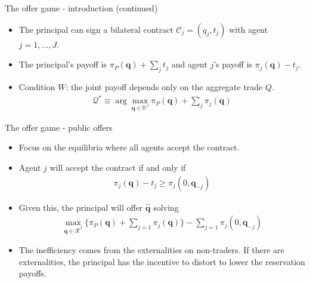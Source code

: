 \documentclass[aspectratio=169]{beamer}  %
\begin{document}
\begin{frame}{The offer game - introduction (continued)}
    \begin{itemize}
        \item The principal can sign a bilateral contract $\mathcal{C}_j=(q_j,t_j)$ with agent $j=1,...,J$. \vspace{.2cm}
        \item The principal's payoff is $\pi_P(\mathbf{q})+\sum_{j}t_j$ and agent $j$'s payoff is $\pi_j(\mathbf{q})-t_j$. \vspace{.2cm}
        \item Condition $W$: the joint payoff depends only on the aggregate trade $Q$. \vspace{.2cm}
        \begin{align*}
            \mathcal{Q}^* \equiv \arg \max_{\mathbf{q} \in \mathbb{R}^J} \pi_P(\mathbf{q}) + \sum_j \pi_j(\mathbf{q})
        \end{align*}
    \end{itemize}
\end{frame}



\begin{frame}{The offer game - public offers}
    \begin{itemize}
        \item Focus on the equilibria where all agents accept the contract. \vspace{.2cm}
        \item Agent $j$ will accept the contract if and only if
        \begin{align*}
            \pi_j(\mathbf{q}) - t_j \geq \pi_j(0, \mathbf{q}_{-j})
        \end{align*}
        \item Given this, the principal will offer $\hat{\mathbf{q}}$ solving
        \begin{align}
            \max_{\mathbf{q} \in \mathcal{R}^J} \{\pi_P(\mathbf{q}) + \sum_{j=1} \pi_j(\mathbf{q})\}  - \sum_{j=1} \pi_j(0, \mathbf{q}_{-j})
        \end{align}
        \item The inefficiency comes from the externalities on non-traders. If there are externalities, the principal has the incentive to distort to lower the reservation payoffs. \vspace{.2cm}
    \end{itemize}
\end{frame}
\end{document}
